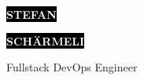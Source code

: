 \documentclass[10pt]{../developercv} %
\begin{document}

\begin{minipage}[t]{0.47\textwidth} %
	\vspace{-\baselineskip} %

	\colorbox{black}{{\HUGE\textcolor{white}{\textbf{\MakeUppercase{Stefan}}}}} %

	\colorbox{black}{{\HUGE\textcolor{white}{\textbf{\MakeUppercase{Schärmeli}}}}} %

	\vspace{6pt} %

	{\LARGE Fullstack DevOps Engineer} %
\end{minipage}
\hfill %
\begin{minipage}[t]{0.25\textwidth} %
	\vspace{-\baselineskip} %

	\\
	\\
	\\
\end{minipage}
\hfill %
\end{document}
